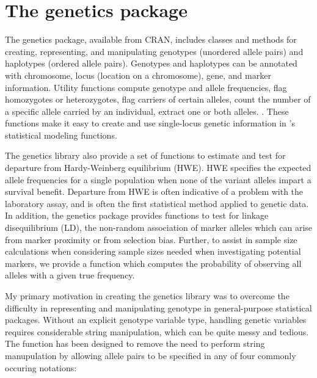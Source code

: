 \documentclass{report}
\begin{document}
\section{The genetics package}

The genetics package, available from CRAN, includes classes and
methods for creating, representing, and manipulating genotypes
(unordered allele pairs) and haplotypes (ordered allele pairs).
Genotypes and haplotypes can be annotated with chromosome, locus
(location on a chromosome), gene, and marker information.  Utility
functions compute genotype and allele frequencies, flag homozygotes or
heterozygotes, flag carriers of certain alleles, count the number of a
specific allele carried by an individual, extract one or both alleles.
.  These functions make it easy to create and use single-locus genetic
information in \R's statistical modeling functions.

The genetics library also provide a set of functions to estimate and
test for departure from Hardy-Weinberg equilibrium (HWE).  HWE
specifies the expected allele frequencies for a single population when
none of the variant alleles impart a survival benefit.  Departure from
HWE is often indicative of a problem with the laboratory assay, and is
often the first statistical method applied to genetic data.  In
addition, the genetics package provides functions to test for linkage
disequilibrium (LD), the non-random association of marker alleles
which can arise from marker proximity or from selection bias.
Further, to assist in sample size calculations when considering sample
sizes needed when investigating potential markers, we provide a
function which computes the probability of observing all alleles with
a given true frequency.

My primary motivation in creating the genetics library was to overcome
the difficulty in representing and manipulating genotype in
general-purpose statistical packages.  Without an explicit genotype
variable type, handling genetic variables requires considerable string
manipulation, which can be quite messy and tedious.  The
 function has been designed to remove the need to
perform string manupulation by allowing allele pairs to be specified
in any of four commonly occuring notations:
\end{document}
